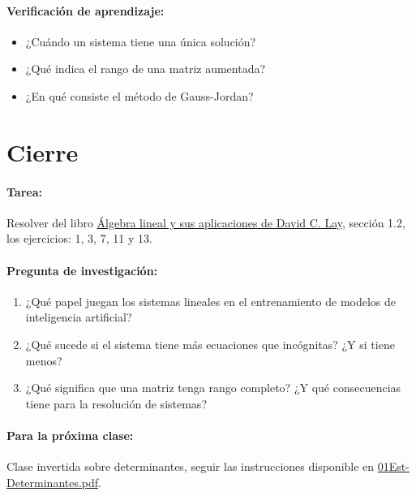 \documentclass[a4,11pt]{aleph-notas}
\begin{document}
\paragraph{Verificación de aprendizaje:}  
\begin{itemize}[leftmargin=*]  
    \item ¿Cuándo un sistema tiene una única solución?  
    \item ¿Qué indica el rango de una matriz aumentada?  
    \item ¿En qué consiste el método de Gauss-Jordan?  
\end{itemize}  

\section*{Cierre}  

\paragraph{Tarea:}  
Resolver del libro \href{https://catalogobiblioteca.puce.edu.ec/cgi-bin/koha/opac-detail.pl?biblionumber=86083&query_desc=kw%2Cwrdl%3A%20%C3%81lgebra%20lineal%20y%20sus%20aplicaciones}{Álgebra lineal y sus aplicaciones de David C. Lay}, sección 1.2, los ejercicios: 1, 3, 7, 11 y 13.

\paragraph{Pregunta de investigación:}  
\begin{enumerate}[leftmargin=*]  
    \item ¿Qué papel juegan los sistemas lineales en el entrenamiento de modelos de inteligencia artificial?
    \item ¿Qué sucede si el sistema tiene más ecuaciones que incógnitas? ¿Y si tiene menos?  
    \item ¿Qué significa que una matriz tenga rango completo? ¿Y qué consecuencias tiene para la resolución de sistemas?
\end{enumerate}  

\paragraph{Para la próxima clase:}  
Clase invertida sobre determinantes, seguir las instrucciones disponible en \href{https://fcena-puce.github.io/AlgLinealyGeomAnalitica-05-N0068/2-ClaseInvertida/01Est-Determinantes.pdf}{01Est-Determinantes.pdf}.  
\end{document}
